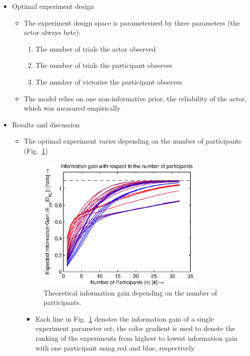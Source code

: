 \documentclass[11pt]{article}
\begin{document}
\begin{itemize}
\begin{itemize}
\begin{enumerate}
                    \end{enumerate}
            \end{itemize}
        \item Optimal experiment design
            \begin{itemize}
                \item The experiment design space is parameterized by three parameters (the actor always bets):
                    \begin{enumerate} 
                        \item The number of trials the actor observed
                        \item The number of trials the participant observes
                        \item The number of victories the participant observes
                    \end{enumerate}
                \item The model relies on one non-informative prior, the reliability of the actor, which was measured empirically
            \end{itemize}
        \item Results and discussion
            \begin{itemize}
                \item The optimal experiment varies depending on the number of participants (Fig.~\ref{fig:npart})
\begin{figure}[h!]
\centering
\includegraphics[width=3.2in]{img/npart.eps}
\caption{Theoretical information gain depending on the number of participants.}
\label{fig:npart}
\end{figure}
                    \begin{itemize}
                        \item Each line in Fig.~\ref{fig:npart} denotes the information gain of a single experiment parameter set; the color gradient is used to denote the ranking of the experiments from highest to lowest information gain with one participant using red and blue, respectively

\end{itemize}
\end{itemize}
\end{itemize}
\end{document}
